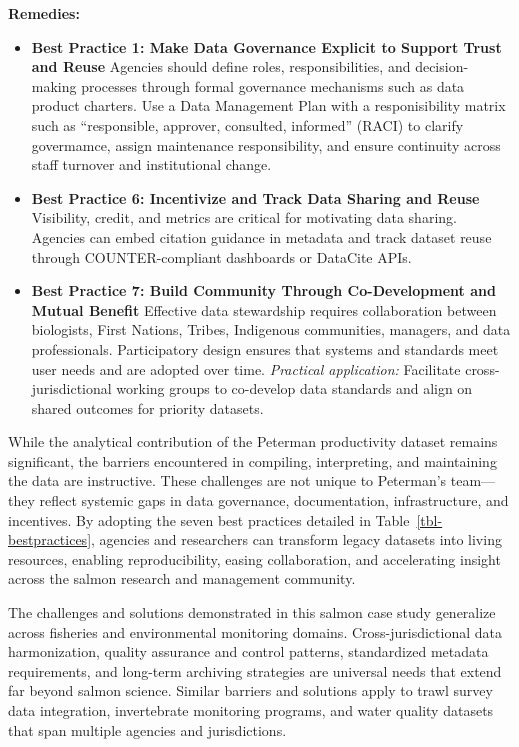 \documentclass[
  letterpaper,
  DIV=11,
  numbers=noendperiod]{scrartcl}
\begin{document}
\textbf{Remedies:}

\begin{itemize}
\item
  \textbf{Best Practice 1: Make Data Governance Explicit to Support
  Trust and Reuse} Agencies should define roles, responsibilities, and
  decision-making processes through formal governance mechanisms such as
  data product charters. Use a Data Management Plan with a
  responisibility matrix such as ``responsible, approver, consulted,
  informed'' (RACI) to clarify govermamce, assign maintenance
  responsibility, and ensure continuity across staff turnover and
  institutional change.
\item
  \textbf{Best Practice 6: Incentivize and Track Data Sharing and Reuse}
  Visibility, credit, and metrics are critical for motivating data
  sharing. Agencies can embed citation guidance in metadata and track
  dataset reuse through COUNTER-compliant dashboards or DataCite APIs.
\item
  \textbf{Best Practice 7: Build Community Through Co-Development and
  Mutual Benefit} Effective data stewardship requires collaboration
  between biologists, First Nations, Tribes, Indigenous communities,
  managers, and data professionals. Participatory design ensures that
  systems and standards meet user needs and are adopted over time.
  \emph{Practical application:} Facilitate cross-jurisdictional working
  groups to co-develop data standards and align on shared outcomes for
  priority datasets.
\end{itemize}

While the analytical contribution of the Peterman productivity dataset
remains significant, the barriers encountered in compiling,
interpreting, and maintaining the data are instructive. These challenges
are not unique to Peterman's team---they reflect systemic gaps in data
governance, documentation, infrastructure, and incentives. By adopting
the seven best practices detailed in Table~\ref{tbl-bestpractices},
agencies and researchers can transform legacy datasets into living
resources, enabling reproducibility, easing collaboration, and
accelerating insight across the salmon research and management
community.

The challenges and solutions demonstrated in this salmon case study
generalize across fisheries and environmental monitoring domains.
Cross-jurisdictional data harmonization, quality assurance and control
patterns, standardized metadata requirements, and long-term archiving
strategies are universal needs that extend far beyond salmon science.
Similar barriers and solutions apply to trawl survey data integration,
invertebrate monitoring programs, and water quality datasets that span
multiple agencies and jurisdictions.
\end{document}
